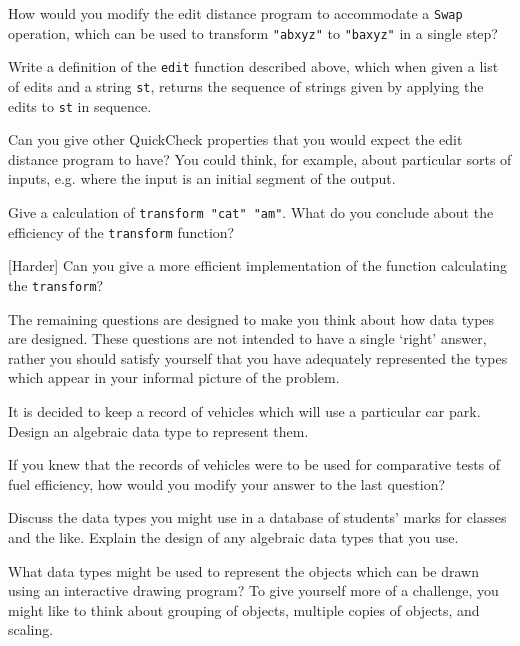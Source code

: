 \begin{exercises}


\item
How would you modify the edit distance program to accommodate a \texttt{Swap}
operation, which can be used to transform \texttt{"abxyz"} to \texttt{"baxyz"} in a
single step?

\item
Write a definition of the \texttt{edit} function described above, which when given a list of edits and a string \texttt{st},
returns the sequence of strings given by applying the edits to \texttt{st} in
sequence.

\item
Can you give other QuickCheck properties that you would expect the edit distance program to have? You could think, for example, about particular sorts of inputs, e.g. where the input is an initial segment of the output.

\item
Give a calculation of \texttt{transform "cat" "am"}. What do you conclude about
the efficiency of the \texttt{transform} function?

\item {[Harder]}
Can you give a more efficient implementation of the function calculating the \texttt{transform}?

\end{exercises}
 
 
\noindent
The remaining questions are designed
to make you think about how data types are designed. These
questions are not intended to have a single `right' answer,
rather you should satisfy yourself that you have adequately
represented the types which appear in your informal picture of
the problem.

\begin{exercises}

\item
It is decided to keep a record of vehicles which will use a particular car
park. Design an algebraic data type to represent them.

\item
If you knew that the records of vehicles were to be used for comparative
tests of fuel efficiency, how would you modify your answer to the last
question?

\item
Discuss the data types you might use in a database of students' marks for
classes and the like. Explain the design of any algebraic data types that
you use.

\item
What data types might be used to represent the objects which can be drawn
using an interactive drawing program? To give yourself more of a challenge, you
might like to think about grouping of objects, multiple copies of objects, and
scaling. 
 
\end{exercises} 
 
